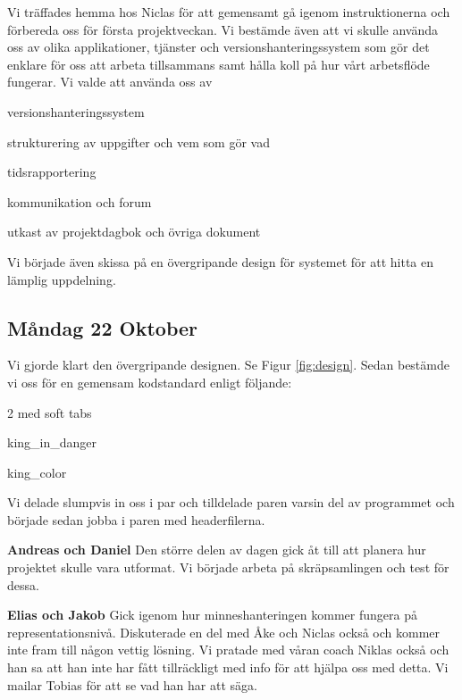\documentclass{article}
\begin{document}
Vi träffades hemma hos Niclas för att gemensamt gå igenom instruktionerna och förbereda oss för första projektveckan. Vi bestämde även att vi skulle använda oss av olika applikationer, tjänster och versionshanteringssystem som gör det enklare för oss att arbeta tillsammans samt hålla koll på hur vårt arbetsflöde fungerar. Vi valde att använda oss av

\begin{description} \parskip0pt
  \item[Git och github] versionshanteringssystem
  \item[Trello] strukturering av uppgifter och vem som gör vad
  \item[Tickspot] tidsrapportering
  \item[Hipchat] kommunikation och forum
  \item[Google Drive] utkast av projektdagbok och övriga dokument
\end{description}
Vi började även skissa på en övergripande design för systemet för att hitta en lämplig uppdelning.

\subsection{Måndag 22 Oktober}

Vi gjorde klart den övergripande designen. Se Figur \ref{fig:design}. Sedan bestämde vi oss för en gemensam kodstandard enligt följande:

\begin{description} \parskip0pt
  \item[Tab size] 2 med soft tabs
  \item[Exempel funktionsnamn] king\_in\_danger
  \item[Exempel variabelnamn] king\_color
\end{description}

Vi delade slumpvis in oss i par och tilldelade paren varsin del av programmet och började sedan jobba i paren med headerfilerna.

{\bf Andreas och Daniel} Den större delen av dagen gick åt till att planera hur projektet skulle vara utformat. Vi började arbeta på skräpsamlingen och test för dessa.

{\bf Elias och Jakob} Gick igenom hur minneshanteringen kommer fungera på representationsnivå. Diskuterade en del med Åke och Niclas också och kommer inte fram till någon vettig lösning. Vi pratade med våran coach Niklas också och han sa att han inte har fått tillräckligt med info för att hjälpa oss med detta. Vi mailar Tobias för att se vad han har att säga.
\end{document}
